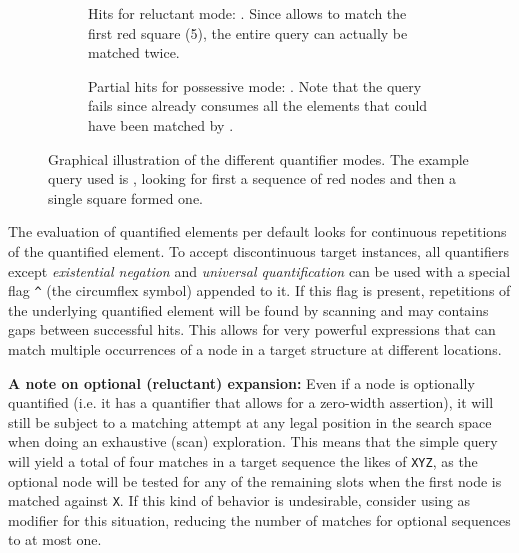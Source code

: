 \documentclass[11pt,a4paper]{report}
\begin{document}
\begin{figure}[!htb]
\begin{subfigure}{.8\textwidth}
		\caption{Hits for reluctant mode: . Since  allows  to match the first red square (5), the entire query can actually be matched twice.}
		\label{fig:reluctant-quantifier}
	\end{subfigure}
	\par\bigskip %
	\begin{subfigure}{.8\textwidth}\centering
		\caption{Partial hits for possessive mode: . Note that the query fails since  already consumes all the elements that could have been matched by .}
		\label{fig:possessive-quantifier}
	\end{subfigure}
	
	\caption[Illustration of quantification]{Graphical illustration of the different quantifier modes. The example query used is , looking for first a sequence of red nodes and then a single square formed one.}
	\label{fig:quantifier-examples}
\end{figure}

The evaluation of quantified elements per default looks for continuous repetitions of the quantified element.
To accept discontinuous target instances, all quantifiers except \textit{existential negation} and \textit{universal quantification} can be used with a special flag \texttt{\textasciicircum} (the circumflex symbol) appended to it.
If this flag is present, repetitions of the underlying quantified element will be found by scanning and may contains gaps between successful hits.
This allows for very powerful expressions that can match multiple occurrences of a node in a target structure at different locations.

\textbf{A note on optional (reluctant) expansion:}
Even if a node is optionally quantified (i.e. it has a quantifier that allows for a zero-width assertion), it will still be subject to a matching attempt at any legal position in the search space when doing an exhaustive (scan) exploration.
This means that the simple query \query{[][?]} will yield a total of four matches in a target sequence the likes of \texttt{XYZ}, as the optional node will be tested for any of the remaining slots when the first node is matched against \texttt{X}.
If this kind of behavior is undesirable, consider using  as modifier for this situation, reducing the number of matches for optional sequences to at most one.
\end{document}

